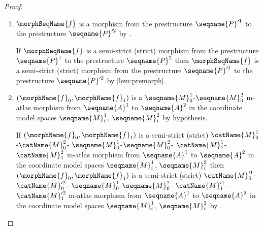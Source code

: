 \documentclass{article}
\begin{document}
\begin{lemma}
\begin{proof}
\begin{enumerate}
\item $\morphSeqName{f}$ is a morphism from the prestructure
$\seqname{P}'^1$ to the prestructure $\seqname{P}'^2$ by
.

If $\morphSeqName{f}$ is a semi-strict (strict) morphism from the
prestructure $\seqname{P}^1$ to the prestructure $\seqname{P}^2$
then $\morphSeqName{f}$ is a semi-strict (strict) morphism from the
prestructure $\seqname{P}'^1$ to the prestructure $\seqname{P}'^2$
by \cref{lem:premorph}.

\item $(\morphName{f}_0, \morphName{f}_1)$ is a
$\seqname{M}^1_0$-$\seqname{M}^2_0$ m-atlas morphism from
$\seqname{A}^1$ to $\seqname{A}^2$ in the coordinate model
spaces $\seqname{M}^1_i$, $\seqname{M}^2_i$ by hypothesis.

If $(\morphName{f}_0, \morphName{f}_1)$ is a semi-strict (strict)
$\catName{M}^1_0$-$\catName{M}^2_0$-%
$\seqname{M}^1_0$-$\seqname{M}^2_0$-
$\catName{M}^1_1$-$\catName{M}^2_1$ m-atlas morphism from
$\seqname{A}^1$ to $\seqname{A}^2$ in the coordinate model spaces
$\seqname{M}^1_i$, $\seqname{M}^2_i$ then
$(\morphName{f}_0, \morphName{f}_1)$ is a semi-strict (strict)
$\catName{M}'^1_0$-$\catName{M}'^2_0$-%
$\seqname{M}^1_0$-$\seqname{M}^2_0$-%
$\catName{M}'^1_1$-$\catName{M}'^2_1$ m-atlas morphism from
$\seqname{A}^1$ to $\seqname{A}^2$ in the coordinate model spaces
$\seqname{M}^1_i$, $\seqname{M}^2_i$ by
.
\end{enumerate}
\end{proof}
\end{lemma}
\end{document}
